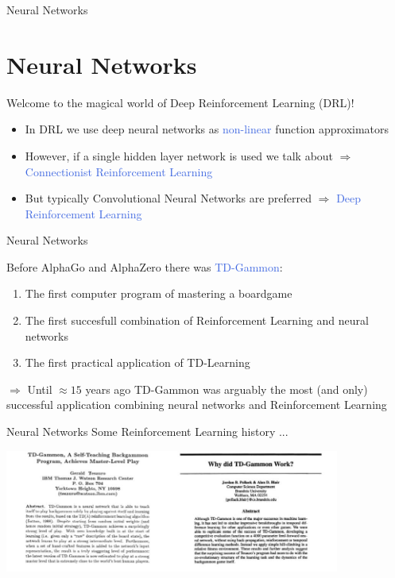 \documentclass{beamer}
\begin{document}
\begin{frame}{Neural Networks}
	\section{Neural Networks}

	\begin{center}
		\textcolor{skymagenta}{Welcome to the magical world of Deep Reinforcement Learning (DRL)!}
	\end{center}

	\begin{itemize}
		\item In DRL we use deep neural networks as \textcolor{RoyalBlue}{non-linear} function approximators
		\item However, if a single hidden layer network is used we talk about $\Rightarrow$ \textcolor{RoyalBlue}{Connectionist Reinforcement Learning}	
		\item But typically Convolutional Neural Networks are preferred $\Rightarrow$ \textcolor{RoyalBlue}{Deep Reinforcement Learning}
	\end{itemize}
	
\end{frame}

\begin{frame}{Neural Networks}

	Before AlphaGo and AlphaZero there was \textcolor{RoyalBlue}{TD-Gammon}:
	\begin{enumerate}
		\item The first computer program of mastering a boardgame  
		\item The first succesfull combination of Reinforcement Learning and neural networks
		\item The first practical application of TD-Learning
	\end{enumerate}

	\begin{center}
		$\Rightarrow$ Until $\approx 15$ years ago TD-Gammon was arguably the most (and only) successful application combining neural networks and Reinforcement Learning
	\end{center}
\end{frame}


\begin{frame}{Neural Networks}
	Some Reinforcement Learning history ...
	\bigskip

	\centering
		\includegraphics[width=11cm]{./Images/tdgammon}

\end{frame}
\end{document}

